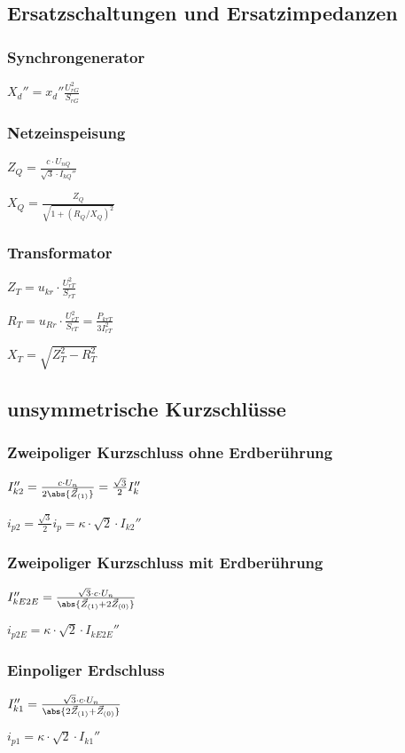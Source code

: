\documentclass[german]{latex4ei/latex4ei_sheet}
\begin{document}
\begin{sectionbox}
\subsection{Ersatzschaltungen und Ersatzimpedanzen}

\subsubsection{Synchrongenerator}
$X_d'' = x_d'' \frac{U_{rG}^2}{S_{rG}}$

\subsubsection{Netzeinspeisung}
$Z_Q = \frac{c \cdot U_{nQ}}{\sqrt 3 \cdot I_{kQ}''}$

$X_Q = \frac{Z_Q}{\sqrt{1 + (R_Q  / X_Q)^2} }$

\subsubsection{Transformator}

$Z_T = u_{kr} \cdot \frac{U_{rT}^2}{S_{rT}}$

$R_T = u_{Rr} \cdot \frac{U_{rT}^2}{S_{rT}} = \frac{P_{krT}}{3 I_{rT}^2}$

$X_T = \sqrt{Z_T^2 - R_T^2} $ \\
\end{sectionbox}

\begin{sectionbox}
\subsection{unsymmetrische Kurzschlüsse}

\subsubsection{Zweipoliger Kurzschluss ohne Erdberührung}

$I_{k2}'' = \frac{c \cdot U_n}{2 \abs{\vec Z_{(1)}}} = \frac{\sqrt{3}}{2} I_k''$

$i_{p2} = \frac{\sqrt 3}{2} i_p = \kappa \cdot \sqrt 2 \cdot I_{k2}''$

\subsubsection{Zweipoliger Kurzschluss mit Erdberührung}

$I_{kE2E}'' = \frac{\sqrt 3 \cdot c \cdot U_n}{\abs{\vec Z_{(1)} + 2 \vec Z_{(0)}}}$

$i_{p2E} = \kappa \cdot \sqrt 2 \cdot I_{kE2E}''$

\subsubsection{Einpoliger Erdschluss}

$I_{k1}'' = \frac{\sqrt 3 \cdot c \cdot U_n}{\abs{2 \vec Z_{(1)} + \vec Z_{(0)}}} $

$i_{p1} = \kappa \cdot \sqrt 2 \cdot I_{k1}''$
\end{sectionbox}
\end{document}
